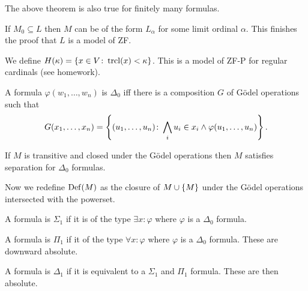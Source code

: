 \begin{corollary}
    The above theorem is also true for finitely many formulas.

    If \(M_{0}\subseteq L\) then \(M\) can be of the form \(L_{\alpha}\) for
    some limit ordinal \(\alpha\). This finishes the proof that \(L\) is a model
    of ZF.
\end{corollary}

\begin{definition}
    We define \(H(\kappa)=\left\{x\in V\colon\operatorname{trcl}(x)<\kappa\right\}\). This is a model
    of ZF-P for regular cardinals (see homework).
\end{definition}

\begin{theorem}
    A formula \(\varphi(w_{1},\ldots,w_{n})\) is \(\Delta_{0}\) iff there is a
    composition \(G\) of Gödel operations such that
    \[
        G(x_{1},\ldots,x_{n})=\left\{(u_{1},\ldots,u_{n})\colon\bigwedge_{i}u_{i}\in x_{i}\wedge\varphi(u_{1},\ldots,u_{n})\right\}.
    \]
\end{theorem}

\begin{corollary}
    If \(M\) is transitive and closed under the Gödel operations then \(M\)
    satisfies separation for \(\Delta_{0}\) formulas.
\end{corollary}

\begin{definition}
    Now we redefine \(\operatorname{Def}(M)\) as the closure of \(M\cup\left\{M\right\}\) under
    the Gödel operations intersected with the powerset.
\end{definition}

\begin{definition}
    A formula is \(\Sigma_{1}\) if it is of the type \(\exists x:\varphi\) where
    \(\varphi\) is a \(\Delta_{0}\) formula.

    A formula is \(\Pi_{1}\) if it of the type \(\forall x:\varphi\) where
    \(\varphi\) is a \(\Delta_{0}\) formula. These are downward absolute.

    A formula is \(\Delta_{1}\) if it is equivalent to a \(\Sigma_{1}\) and
    \(\Pi_{1}\) formula. These are then absolute.
\end{definition}

